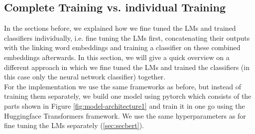 \subsection{Complete Training vs. individual Training}
In the sections before, we explained how we fine tuned the LMs and trained classifiers individually, i.e. fine tuning the LMs first, concatenating their outputs with the linking word embeddings and training a classifier on these combined embeddings afterwards. In this section, we will give a quick overview on a different approach in which we fine tuned the LMs and trained the classifiers (in this case only the neural network classifier) together. \\
For the implementation we use the same frameworks as before, but instead of training them separately, we build one model using pytorch which consists of the parts shown in Figure \ref{fig:model-architecture1} and train it in one go using the Huggingface Transformers framework. We use the same hyperparameters as for fine tuning the LMs separately (\ref{sec:secbert}).